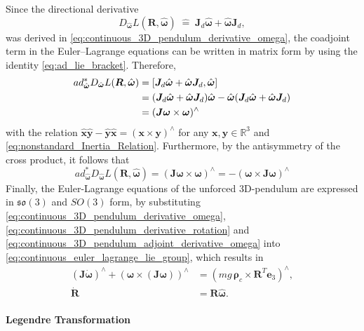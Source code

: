 Since the directional derivative
\[
D_{\hat{\bm{\omega}}}L(\bm{R},\hat{\bm{\omega}})
\;\widehat{=}\;
\bm{J}_d\hat{\bm{\omega}}+\hat{\bm{\omega}}\bm{J}_d,
\]
was derived in \eqref{eq:continuous_3D_pendulum_derivative_omega}, the coadjoint term in the Euler--Lagrange equations can be written in matrix form by using the identity \eqref{eq:ad_lie_bracket}. Therefore,
\begin{align}
ad^*_{\hat{\bm{\omega}}}D_{\hat{\bm{\omega}}}L(\bm{R},\hat{\bm{\omega}})
&=
\left[\bm{J}_d\hat{\bm{\omega}}+\hat{\bm{\omega}}\bm{J}_d,\hat{\bm{\omega}}\right] \notag \\
&=
(\bm{J}_d\hat{\bm{\omega}}+\hat{\bm{\omega}}\bm{J}_d)\hat{\bm{\omega}}
-
\hat{\bm{\omega}}(\bm{J}_d\hat{\bm{\omega}}+\hat{\bm{\omega}}\bm{J}_d) \notag \\
&=
(\bm{J}\bm{\omega} \times \bm{\omega})^\wedge \notag
\end{align}
with the relation $\hat{\bm{x}}\hat{\bm{y}}-\hat{\bm{y}}\hat{\bm{x}}=(\bm{x} \times \bm{y})^\wedge$ for any $\bm{x},\bm{y} \in \mathbb{R}^3$ and \eqref{eq:nonstandard_Inertia_Relation}. Furthermore, by the antisymmetry of the cross product, it follows that
\begin{equation} \label{eq:continuous_3D_pendulum_adjoint_derivative_omega}   
ad^*_{\hat{\bm{\omega}}}D_{\hat{\bm{\omega}}}L(\bm{R},\hat{\bm{\omega}})
= (\bm{J}\bm{\omega} \times \bm{\omega})^\wedge
= -(\bm{\omega} \times \bm{J} \bm{\omega})^\wedge
\end{equation}
\indent Finally, the Euler-Lagrange equations of the unforced 3D-pendulum are expressed in $\mathfrak{so}(3)$ and $SO(3)$ form, by substituting \eqref{eq:continuous_3D_pendulum_derivative_omega}, \eqref{eq:continuous_3D_pendulum_derivative_rotation} and \eqref{eq:continuous_3D_pendulum_adjoint_derivative_omega} into \eqref{eq:continuous_euler_lagrange_lie_group}, which results in
\begin{subequations}\label{eq:continuous_3D_pendulum_euler_lagrange}
\begin{align}
 (\bm{J}\dot{\bm{\omega}})^\wedge + (\bm{\omega}\times (\bm{J}\bm{\omega}))^\wedge
 &= (mg\,\bm{\rho}_c \times \bm{R}^T\bm{e}_3)^\wedge,
 \label{eq:continuous_3D_pendulum_euler_lagrange_dynamics} \\
 \dot{\bm{R}} &= \bm{R}\hat{\bm{\omega}}.
 \label{eq:continuous_3D_pendulum_euler_lagrange_kinematics}
\end{align}
\end{subequations}

\paragraph{Legendre Transformation}

